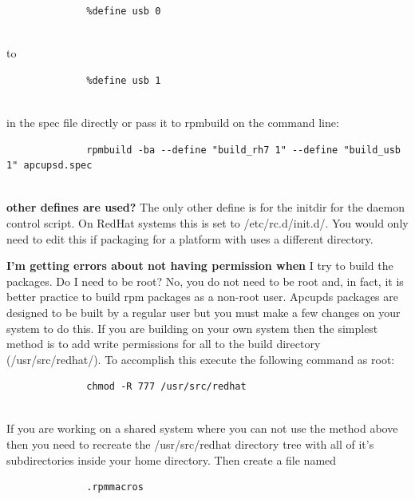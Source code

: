 {{{{{{{{{{{{{{{{{\begin{description}
\footnotesize
\begin{verbatim}
              %define usb 0
     
\end{verbatim}
\normalsize

to  

\footnotesize
\begin{verbatim}
              %define usb 1
     
\end{verbatim}
\normalsize

in the spec file directly or pass it to rpmbuild on the command line:  

\footnotesize
\begin{verbatim}
              rpmbuild -ba --define "build_rh7 1" --define "build_usb 1" apcupsd.spec
     
\end{verbatim}
\normalsize


\item {\bf {\bf other defines are used?}}
The only other define is for the initdir for the daemon control script. On
RedHat systems this is set to /etc/rc.d/init.d/.  You would only need to edit
this if packaging for a platform with uses a different directory.  

\item {\bf {\bf I'm getting errors about not having permission when}}
I try to build the packages.  Do I need to be root? No, you do not need to be
root and, in fact, it is better practice to build rpm packages as a non-root
user.  Apcupds packages are designed to be built by a regular user but you
must make a few changes on your system to do this.  If you are building on
your own system then the simplest method is to add write permissions for all
to the build directory (/usr/src/redhat/).  To accomplish this execute the
following command as root:  

\footnotesize
\begin{verbatim}
              chmod -R 777 /usr/src/redhat
     
\end{verbatim}
\normalsize

If you are working on a shared system where you can not use the method above
then you need to recreate the /usr/src/redhat directory tree with all of it's
subdirectories inside your home directory. Then create a file named  

\footnotesize
\begin{verbatim}
              .rpmmacros
     

\end{verbatim}
\end{description}}}}}}}}}}}}}}}}}}
